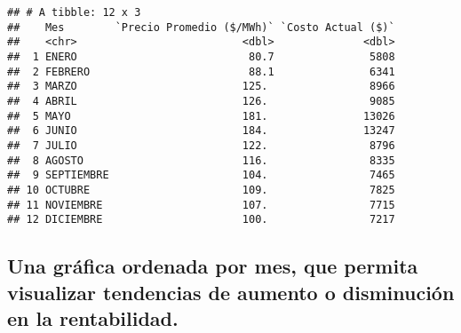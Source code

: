 \documentclass[
]{article}
\begin{document}
\begin{verbatim}
## # A tibble: 12 x 3
##    Mes        `Precio Promedio ($/MWh)` `Costo Actual ($)`
##    <chr>                          <dbl>              <dbl>
##  1 ENERO                           80.7               5808
##  2 FEBRERO                         88.1               6341
##  3 MARZO                          125.                8966
##  4 ABRIL                          126.                9085
##  5 MAYO                           181.               13026
##  6 JUNIO                          184.               13247
##  7 JULIO                          122.                8796
##  8 AGOSTO                         116.                8335
##  9 SEPTIEMBRE                     104.                7465
## 10 OCTUBRE                        109.                7825
## 11 NOVIEMBRE                      107.                7715
## 12 DICIEMBRE                      100.                7217
\end{verbatim}

\subsection{Una gráfica ordenada por mes, que permita visualizar
tendencias de aumento o disminución en la
rentabilidad.}\label{una-gruxe1fica-ordenada-por-mes-que-permita-visualizar-tendencias-de-aumento-o-disminuciuxf3n-en-la-rentabilidad.}
\end{document}
